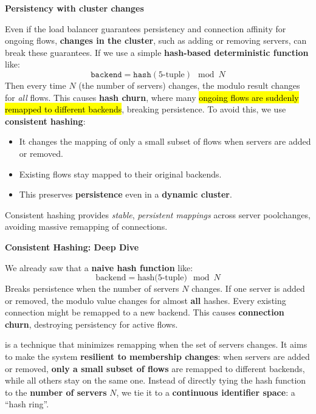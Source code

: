\highspace
\begin{flushleft}
    \textcolor{Red2}{ \textbf{Persistency with cluster changes}}
\end{flushleft}
Even if the load balancer guarantees persistency and connection affinity for ongoing flows, \textbf{changes in the cluster}, such as adding or removing servers, can break these guarantees. If we use a simple \textbf{hash-based deterministic function} like:
\begin{equation*}
    \texttt{backend} = \texttt{hash}\left(\text{5-tuple}\right) \mod N
\end{equation*}
Then every time $N$ (the number of servers) changes, the modulo result changes for \emph{all} flows. \textcolor{Red2}{} This causes \textbf{hash churn}, where many \hl{ongoing flows are suddenly remapped to different backends}, breaking persistence. \textcolor{Green3}{} To avoid this, we use \textbf{consistent hashing}:
\begin{itemize}
    \item It changes the mapping of only a small subset of flows when servers are added or removed.
    \item Existing flows stay mapped to their original backends.
    \item This preserves \textbf{persistence} even in a \textbf{dynamic cluster}.
\end{itemize}
Consistent hashing provides \emph{stable}, \emph{persistent mappings} across server pool\break changes, avoiding massive remapping of connections.

\highspace
\begin{flushleft}
    \textcolor{Green3}{ \textbf{Consistent Hashing: Deep Dive}}
\end{flushleft}
We already saw that a \textbf{naive hash function} like:
\begin{equation*}
    \text{backend} = \text{hash(5-tuple)} \mod N
\end{equation*}
Breaks persistence when the number of servers $N$ changes. If one server is added or removed, the modulo value changes for almost \textbf{all} hashes. Every existing connection might be remapped to a new backend. This causes \textbf{connection churn}, destroying persistency for active flows.

\highspace
{} is a technique that minimizes remapping when the set of servers changes. It aims to make the system \textbf{resilient to membership changes}: when servers are added or removed, \textbf{only a small subset of flows} are remapped to different backends, while all others stay on the same one. Instead of directly tying the hash function to the \textbf{number of servers} $N$, we tie it to a \textbf{continuous identifier space}: a ``hash ring''.

